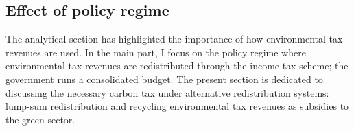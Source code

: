 
\clearpage
\subsection{Effect of policy regime}

The analytical section has highlighted the importance of how environmental tax revenues are used. In the main part, I focus on the policy regime where environmental tax revenues are redistributed through the income tax scheme; the government runs a consolidated budget. 
The present section is dedicated to discussing the necessary carbon tax under alternative redistribution systems: lump-sum redistribution and recycling environmental tax revenues as subsidies to the green sector. 


